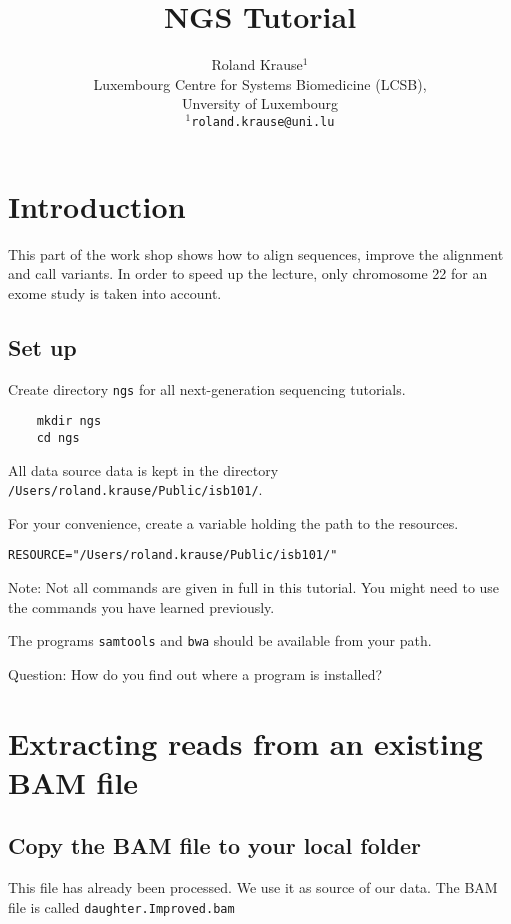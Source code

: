 \documentclass{article}
\title{NGS Tutorial}
\author{Roland Krause$^1$ \\[1em]Luxembourg Centre for Systems Biomedicine (LCSB),\\ Unversity of Luxembourg\\
\texttt{$^1$roland.krause@uni.lu}}
\begin{document}
\maketitle

\tableofcontents

\section{Introduction}

This part of the work shop shows how to align sequences,
improve the alignment and call variants. In order to speed up the
lecture, only chromosome 22 for an exome study is taken into account.

\subsection{Set up}
Create directory \verb+ngs+ for all next-generation sequencing tutorials.
 
\begin{verbatim}
 	mkdir ngs
	cd ngs
\end{verbatim}





All data source data is kept in the directory \verb+/Users/roland.krause/Public/isb101/+. 

For your convenience, create a variable holding the path to the resources.

\begin{verbatim}
RESOURCE="/Users/roland.krause/Public/isb101/"
\end{verbatim}

Note: Not all commands are given in full in this tutorial. 
You might need to use the commands you have learned previously.

The programs \verb+samtools+ and \verb+bwa+ should be available from your path.

Question: How do you find out where a program is installed?

\section{Extracting reads from an existing BAM file}
\subsection{Copy the BAM file to your local folder}
This file has already been processed. We use it as source of our data.
The BAM file is called  \verb+daughter.Improved.bam+
\end{document}
